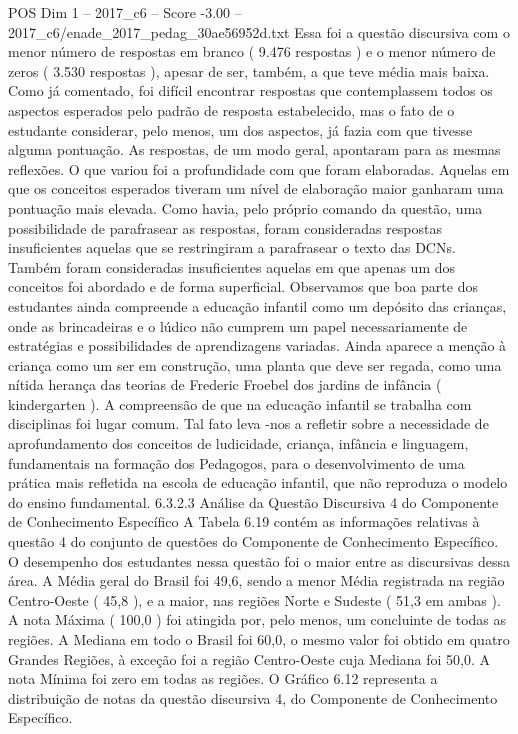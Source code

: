 \begin{textsample}{POS Dim 1 – 2017\_c6 – Score -3.00 – 2017\_c6/enade\_2017\_pedag\_30ae56952d.txt}
Essa foi a questão discursiva com o menor número de respostas em branco ( 9.476 respostas ) e o menor número de zeros ( 3.530 respostas ), apesar de ser, também, a que teve média mais baixa.
Como já comentado, foi difícil encontrar respostas que contemplassem todos os aspectos esperados pelo padrão de resposta estabelecido, mas o fato de o estudante considerar, pelo menos, um dos aspectos, já fazia com que tivesse alguma pontuação.
As respostas, de um modo geral, apontaram para as mesmas reflexões.
O que variou foi a profundidade com que foram elaboradas.
Aquelas em que os conceitos esperados tiveram um nível de elaboração maior ganharam uma pontuação mais elevada.
Como havia, pelo próprio comando da questão, uma possibilidade de parafrasear as respostas, foram consideradas respostas insuficientes aquelas que se restringiram a parafrasear o texto das DCNs.
Também foram consideradas insuficientes aquelas em que apenas um dos conceitos foi abordado e de forma superficial.
Observamos que boa parte dos estudantes ainda compreende a educação infantil como um depósito das crianças, onde as brincadeiras e o lúdico não cumprem um papel necessariamente de estratégias e possibilidades de aprendizagens variadas.
Ainda aparece a menção à criança como um ser em construção, uma planta que deve ser regada, como uma nítida herança das teorias de Frederic Froebel dos jardins de infância ( kindergarten ).
A compreensão de que na educação infantil se trabalha com disciplinas foi lugar comum.
Tal fato leva -nos a refletir sobre a necessidade de aprofundamento dos conceitos de ludicidade, criança, infância e linguagem, fundamentais na formação dos Pedagogos, para o desenvolvimento de uma prática mais refletida na escola de educação infantil, que não reproduza o modelo do ensino fundamental. 6.3.2.3 Análise da Questão Discursiva 4 do Componente de Conhecimento Específico A Tabela 6.19 contém as informações relativas à questão 4 do conjunto de questões do Componente de Conhecimento Específico.
O desempenho dos estudantes nessa questão foi o maior entre as discursivas dessa área.
A Média geral do Brasil foi 49,6, sendo a menor Média registrada na região Centro-Oeste ( 45,8 ), e a maior, nas regiões Norte e Sudeste ( 51,3 em ambas ).
A nota Máxima ( 100,0 ) foi atingida por, pelo menos, um concluinte de todas as regiões.
A Mediana em todo o Brasil foi 60,0, o mesmo valor foi obtido em quatro Grandes Regiões, à exceção foi a região Centro-Oeste cuja Mediana foi 50,0.
A nota Mínima foi zero em todas as regiões.
O Gráfico 6.12 representa a distribuição de notas da questão discursiva 4, do Componente de Conhecimento Específico.

\end{textsample}
